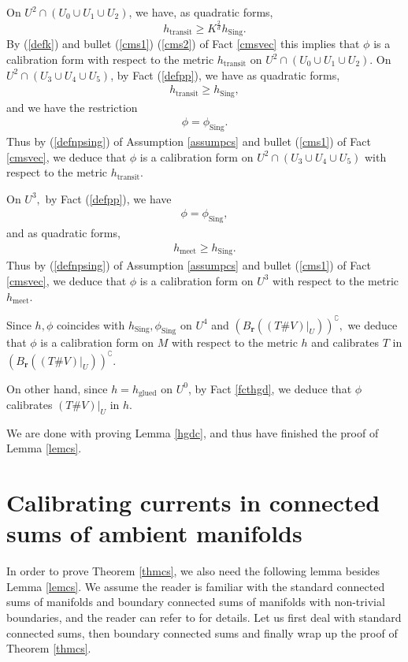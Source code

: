 \documentclass[11pt,a4paper]{amsart}
\numberwithin{equation}{section}
\newcommand{\hgd}{h_{\operatorname{glued}}}
\newcommand{\htt}{h_{\operatorname{transit}}}
\newcommand{\hmt}{h_{\operatorname{meet}}}
\newcommand{\sing}{{\operatorname{Sing}}}
\newcommand{\cp}{^\complement}
\newcommand{\mfr}{{\mathbf{r}}}
\newcommand{\tvu}{(T\#V)|_U}
\newcommand{\ur}{B_{\mfr}(\tvu)}
\theoremstyle{plain}
\theoremstyle{definition}
\numberwithin{equation}{subsection}
\begin{document}
	On $U^2\cap(U_0\cup U_1\cup U_2)$, we have, as quadratic forms,
	$$\htt\ge K^{\frac{2}{d}} h_\sing.$$ By (\ref{defk}) and bullet (\ref{cms1}) (\ref{cms2}) of Fact \ref{cmsvec} this implies that $\phi$ is a calibration form with respect to the metric $\htt$ on $U^2\cap(U_0\cup U_1\cup U_2)$. On $U^2\cap(U_3\cup U_4\cup U_5)$, by Fact (\ref{defpp}), we have as quadratic forms,
	\begin{align*}
		\htt\ge h_\sing,
	\end{align*}and we have the restriction
	\begin{align*}
		\phi=\phi_\sing.
	\end{align*}
	Thus by (\ref{defnpsing}) of Assumption \ref{assumpcs} and bullet (\ref{cms1}) of Fact \ref{cmsvec}, we deduce that $\phi$ is a calibration form on $U^2\cap(U_3\cup U_4\cup U_5)$ with respect to the metric $\htt.$ 
	
	On $U^3,$ by Fact (\ref{defpp}), we have 
	\begin{align*}
		\phi=\phi_\sing,
	\end{align*}
	and as quadratic forms,
	\begin{align*}
		\hmt\ge h_\sing.
	\end{align*}
	Thus by (\ref{defnpsing}) of Assumption \ref{assumpcs} and bullet (\ref{cms1}) of Fact \ref{cmsvec}, we deduce that $\phi$ is a calibration form on $U^3$ with respect to the metric $\hmt.$ 
	
	Since $h,\phi$ coincides with $h_\sing,\phi_\sing$ on $U^4$ and $(\ur)\cp,$ we deduce that $\phi$ is a calibration form on $M$ with respect to the metric $h$ and calibrates $T$ in $(\ur)\cp$.
	
	On other hand, since $h=\hgd$ on $U^0$, by Fact \ref{fcthgd}, we deduce that $\phi$ calibrates $\tvu$ in $h.$ 
	
	We are done with proving Lemma \ref{hgdc}, and thus have finished the proof of Lemma \ref{lemcs}.
	\section{Calibrating currents in connected sums of ambient manifolds}\label{seccs2}
	In order to prove Theorem \ref{thmcs}, we also need the following lemma besides Lemma \ref{lemcs}. We assume the reader is familiar with the standard connected sums of manifolds and boundary connected sums of manifolds with non-trivial boundaries, and the reader can refer to \cite[Chapter VI.1 and VI.3]{AK} for details. Let us first deal with standard connected sums, then boundary connected sums and finally wrap up the proof of Theorem \ref{thmcs}.
\end{document}
